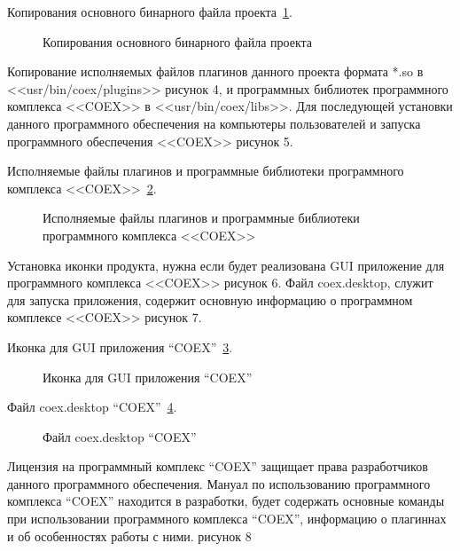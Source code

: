 Копирования основного бинарного файла проекта~\ref{cpcoex:cpcoex}.

\begin{figure}[h!]
\caption{Копирования основного бинарного файла проекта}
\label{cpcoex:cpcoex}
\end{figure}


Копирование исполняемых файлов плагинов данного проекта формата *.so в <<usr/bin/coex/plugins>> рисунок 4, и программных библиотек программного комплекса <<COEX>> в <<usr/bin/coex/libs>>. Для последующей установки данного программного обеспечения на компьютеры пользователей и запуска программного обеспечения <<COEX>> рисунок 5. 

Исполняемые файлы плагинов и программные библиотеки программного комплекса <<COEX>>~\ref{PluginsAndLibs:PluginsAndLibs}.

\begin{figure}[h!]
\caption{Исполняемые файлы плагинов и программные библиотеки программного комплекса <<COEX>>}
\label{PluginsAndLibs:PluginsAndLibs}
\end{figure}

Установка иконки продукта, нужна если будет реализована GUI приложение для программного комплекса <<COEX>> рисунок 6. Файл coex.desktop, служит для запуска приложения, содержит основную информацию о программном комплексе <<COEX>> рисунок 7.

Иконка для GUI приложения ``COEX''~\ref{image:image}.

\begin{figure}[h!]
\caption{ Иконка для GUI приложения ``COEX'' }
\label{image:image}
\end{figure}

Файл coex.desktop ``COEX''~\ref{Aplicatio:Aplicatio}.

\begin{figure}[h!]
\caption{ Файл coex.desktop ``COEX'' }
\label{Aplicatio:Aplicatio}
\end{figure}

Лицензия на программный комплекс ``COEX'' защищает права разработчиков данного программного обеспечения. Мануал по использованию программного комплекса ``COEX'' находится в разработки, будет содержать основные команды при использовании программного комплекса ``COEX'', информацию о плагиннах и об особенностях работы с ними. рисунок 8


